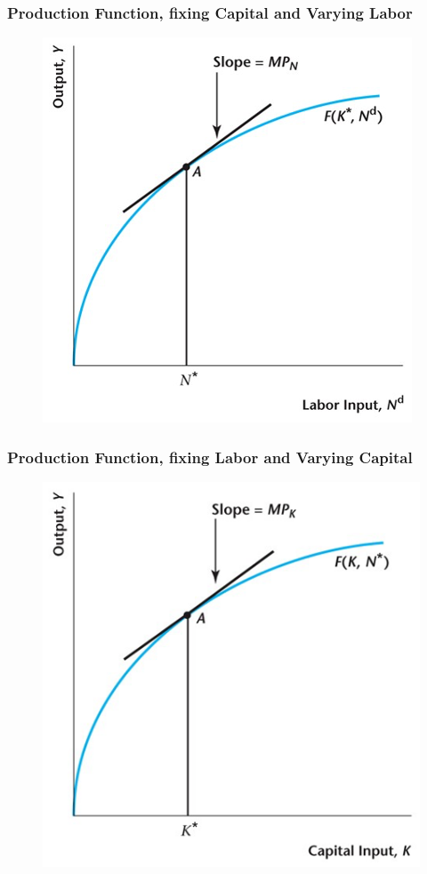 \documentclass{beamer}
\begin{document}
\begin{frame}
\frametitle[alignment=center]{Production Function, fixing Capital and Varying Labor}
\begin{figure}
\centering
\includegraphics[scale=0.5]{Figures/W_Fig_4pt12.png}
\end{figure}
\end{frame}

\begin{frame}
\frametitle[alignment=center]{Production Function, fixing Labor and Varying Capital}
\begin{figure}
\centering
\includegraphics[scale=0.5]{Figures/W_Fig_4pt13.png}
\end{figure}
\end{frame}
\end{document}
